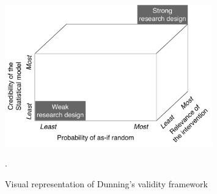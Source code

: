 \begin{figure}
    \large
    \sffamily
    \begin{small}
        \label{fig:validity_framework}
        \begin{center}
            \includegraphics[width=0.80\textwidth]{exhibits/validity_framework.pdf}
        \end{center}
    \end{small}
    \caption{Visual representation of Dunning's validity framework \parencite[][page]{dunning2012}}.
\end{figure}
